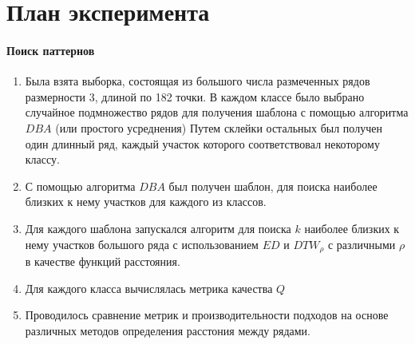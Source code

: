 \documentclass[12pt,twoside]{article}
\begin{document}
				
    \section{План эксперимента}
        \paragraph{Поиск паттернов}
        \begin{enumerate}[label=\arabic*)]
            \item Была взята выборка, состоящая из большого числа размеченных рядов размерности $3$, длиной по 182 точки.
                В каждом классе было выбрано случайное подмножество рядов для получения шаблона с помощью алгоритма $DBA$ (или простого усреднения)
                Путем склейки остальных был получен один длинный ряд, каждый участок которого соответствовал некоторому классу.
            \item С помощью алгоритма $DBA$ был получен шаблон, для поиска наиболее близких к нему участков для каждого из классов.
            \item Для каждого шаблона запускался алгоритм для поиска $k$ наиболее близких к нему участков большого ряда с использованием $ED$ и $DTW_\rho$
                с различными $\rho$ в качестве функций расстояния.
            \item Для каждого класса вычислялась метрика качества $Q$
            \item Проводилось сравнение метрик и производительности подходов на основе различных методов определения расстония между рядами.

        \end{enumerate}
        
\end{document}
